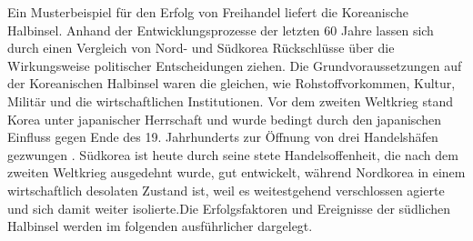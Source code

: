 Ein Musterbeispiel f{\"u}r den Erfolg von Freihandel liefert die Koreanische Halbinsel. Anhand der Entwicklungsprozesse der letzten 60 Jahre lassen sich durch einen Vergleich von Nord- und S{\"u}dkorea R{\"u}ckschl{\"u}sse {\"u}ber die Wirkungsweise politischer Entscheidungen ziehen. \newline Die Grundvoraussetzungen auf der Koreanischen Halbinsel waren die gleichen, wie Rohstoffvorkommen, Kultur, Milit{\"a}r und die wirtschaftlichen Institutionen. Vor dem zweiten Weltkrieg stand Korea unter japanischer Herrschaft und wurde bedingt durch den japanischen Einfluss gegen Ende des 19. Jahrhunderts zur {\"O}ffnung von drei Handelsh{\"a}fen gezwungen \citep{Engelhard.2004,Lee.1999}.\newline 
S{\"u}dkorea ist heute durch seine stete Handelsoffenheit, die nach dem zweiten Weltkrieg ausgedehnt wurde, gut entwickelt, w{\"a}hrend Nordkorea in einem wirtschaftlich desolaten Zustand ist, weil es weitestgehend verschlossen agierte und sich damit weiter isolierte.\newline Die Erfolgsfaktoren und Ereignisse der s{\"u}dlichen Halbinsel werden im folgenden ausf{\"u}hrlicher dargelegt.
